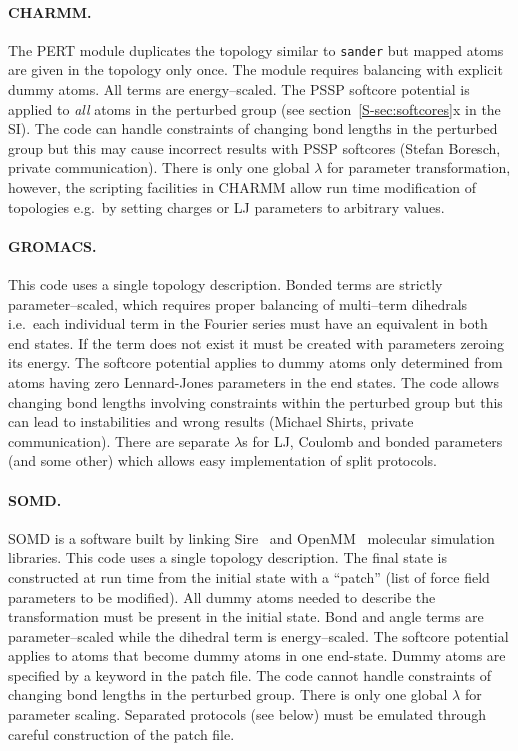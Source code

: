 \documentclass[journal=jctcce,manuscript=article]{achemso}
\newcommand{\progname}[1]{\texttt{#1}}
\begin{document}
\paragraph{CHARMM.} The PERT module duplicates the topology similar to
\progname{sander} but mapped atoms are given in the topology only once.
The module requires balancing with explicit dummy atoms.  All terms are
energy--scaled.  The PSSP softcore potential is applied to \emph{all}
atoms in the perturbed group (see section~\ref{S-sec:softcores}x in the SI).  
The 
code can handle constraints of changing bond lengths in the perturbed group but 
this
may cause incorrect results with PSSP softcores (Stefan Boresch, private
communication).  There is only one global $\lambda$ for parameter
transformation, however, the scripting facilities in CHARMM allow run time
modification of topologies e.g.\ by setting charges or LJ parameters
to arbitrary values.

\paragraph{GROMACS.} This code uses a single topology description.
Bonded terms are strictly parameter--scaled, which requires proper
balancing of multi--term dihedrals i.e.\ each individual term in the Fourier 
series must have an equivalent in both end states.  If the term does not exist 
it must be created with parameters zeroing its energy.
The softcore potential applies to dummy 
atoms only determined from atoms having zero Lennard-Jones parameters in the end states.
The code allows changing bond lengths involving constraints within the perturbed group  but this can lead to instabilities and wrong results (Michael Shirts, private communication).  There are separate $\lambda$s for LJ,
Coulomb and bonded parameters (and some other) which allows easy implementation 
of split protocols.

\paragraph{SOMD.} SOMD is a software built by linking  Sire~\cite{Sire-2016}
and OpenMM~\cite{doi:10.1021/ct300857j} molecular simulation libraries. 
This code uses a single topology description.
The final state is constructed at run time from the initial state with
a ``patch'' (list of force field parameters to be modified). All dummy atoms
needed to describe the transformation must be present in the initial state. 
Bond and angle terms are parameter--scaled while the dihedral term is
energy--scaled.  The softcore potential applies to atoms that become dummy atoms
 in one end-state. Dummy atoms are specified by a keyword in the patch file.
The code cannot handle constraints of changing bond lengths in the
perturbed group.  There is only one global $\lambda$ for parameter
scaling.  Separated protocols (see below) must be emulated through
careful construction of the patch file. 
\end{document}
